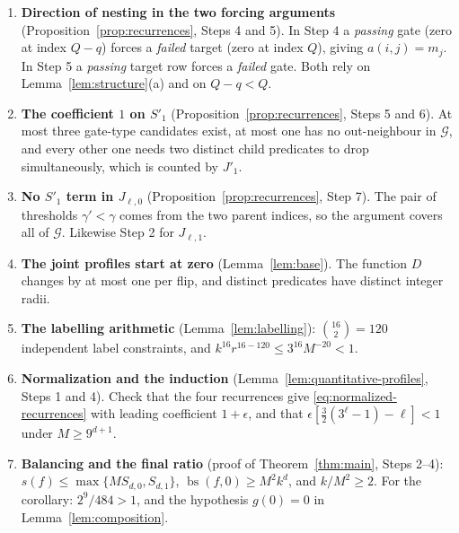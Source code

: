 \documentclass[11pt]{article}
\newcommand{\bs}{\operatorname{bs}}
\theoremstyle{definition}
\theoremstyle{remark}
\begin{document}
\begin{enumerate}[leftmargin=2em]
\item \textbf{Direction of nesting in the two forcing arguments}
(Proposition~\ref{prop:recurrences}, Steps 4 and 5). In Step 4 a
\emph{passing} gate (zero at index \(Q-q\)) forces a \emph{failed} target
(zero at index \(Q\)), giving \(a(i,j)=m_j\). In Step 5 a \emph{passing}
target row forces a \emph{failed} gate. Both rely on
Lemma~\ref{lem:structure}(a) and on \(Q-q<Q\).
\item \textbf{The coefficient \(1\) on \(S'_1\)}
(Proposition~\ref{prop:recurrences}, Steps 5 and 6). At most three gate-type
candidates exist, at most one has no out-neighbour in \(\mathcal G\), and
every other one needs two distinct child predicates to drop simultaneously,
which is counted by \(J'_1\).
\item \textbf{No \(S'_1\) term in \(J_{\ell,0}\)}
(Proposition~\ref{prop:recurrences}, Step 7). The pair of thresholds
\(\gamma'<\gamma\) comes from the two parent indices, so the argument covers
all of \(\mathcal G\). Likewise Step 2 for \(J_{\ell,1}\).
\item \textbf{The joint profiles start at zero} (Lemma~\ref{lem:base}). The
function \(D\) changes by at most one per flip, and distinct predicates have
distinct integer radii.
\item \textbf{The labelling arithmetic} (Lemma~\ref{lem:labelling}):
\(\binom{16}{2}=120\) independent label constraints, and
\(k^{16}r^{16-120}\le3^{16}M^{-20}<1\).
\item \textbf{Normalization and the induction}
(Lemma~\ref{lem:quantitative-profiles}, Steps 1 and 4). Check that the four
recurrences give \eqref{eq:normalized-recurrences} with leading coefficient
\(1+\epsilon\), and that
\(\epsilon[\tfrac32(3^\ell-1)-\ell]<1\) under \(M\ge9^{d+1}\).
\item \textbf{Balancing and the final ratio} (proof of
Theorem~\ref{thm:main}, Steps 2--4):
\(s(f)\le\max\{MS_{d,0},S_{d,1}\}\), \(\bs(f,0)\ge M^2k^d\), and
\(k/M^2\ge2\). For the corollary: \(2^9/484>1\), and the hypothesis
\(g(0)=0\) in Lemma~\ref{lem:composition}.
\end{enumerate}



\end{document}
